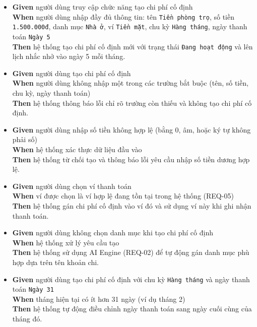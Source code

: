 \begin{itemize}
\item \textbf{Given} người dùng truy cập chức năng tạo chi phí cố định  \\ \hspace*{1.5em}  \textbf{When} người dùng nhập đầy đủ thông tin: tên \texttt{Tiền phòng trọ}, số tiền \texttt{1.500.000đ}, danh mục \texttt{Nhà ở}, ví \texttt{Tiền mặt}, chu kỳ \texttt{Hàng tháng}, ngày thanh toán \texttt{Ngày 5}  \\ \hspace*{1.5em}  \textbf{Then} hệ thống tạo chi phí cố định mới với trạng thái \texttt{Đang hoạt động} và lên lịch nhắc nhở vào ngày 5 mỗi tháng.
\item \textbf{Given} người dùng tạo chi phí cố định  \\ \hspace*{1.5em}  \textbf{When} người dùng không nhập một trong các trường bắt buộc (tên, số tiền, chu kỳ, ngày thanh toán)  \\ \hspace*{1.5em}  \textbf{Then} hệ thống thông báo lỗi chỉ rõ trường còn thiếu và không tạo chi phí cố định.
\item \textbf{Given} người dùng nhập số tiền không hợp lệ (bằng 0, âm, hoặc ký tự không phải số)  \\ \hspace*{1.5em}  \textbf{When} hệ thống xác thực dữ liệu đầu vào  \\ \hspace*{1.5em}  \textbf{Then} hệ thống từ chối tạo và thông báo lỗi yêu cầu nhập số tiền dương hợp lệ.
\item \textbf{Given} người dùng chọn ví thanh toán  \\ \hspace*{1.5em}  \textbf{When} ví được chọn là ví hợp lệ đang tồn tại trong hệ thống (REQ-05)  \\ \hspace*{1.5em}  \textbf{Then} hệ thống gán chi phí cố định vào ví đó và sử dụng ví này khi ghi nhận thanh toán.
\item \textbf{Given} người dùng không chọn danh mục khi tạo chi phí cố định  \\ \hspace*{1.5em}  \textbf{When} hệ thống xử lý yêu cầu tạo  \\ \hspace*{1.5em}  \textbf{Then} hệ thống sử dụng AI Engine (REQ-02) để tự động gán danh mục phù hợp dựa trên tên khoản chi.
\item \textbf{Given} người dùng tạo chi phí cố định với chu kỳ \texttt{Hàng tháng} và ngày thanh toán \texttt{Ngày 31}  \\ \hspace*{1.5em}  \textbf{When} tháng hiện tại có ít hơn 31 ngày (ví dụ tháng 2)  \\ \hspace*{1.5em}  \textbf{Then} hệ thống tự động điều chỉnh ngày thanh toán sang ngày cuối cùng của tháng đó.
\end{itemize}
